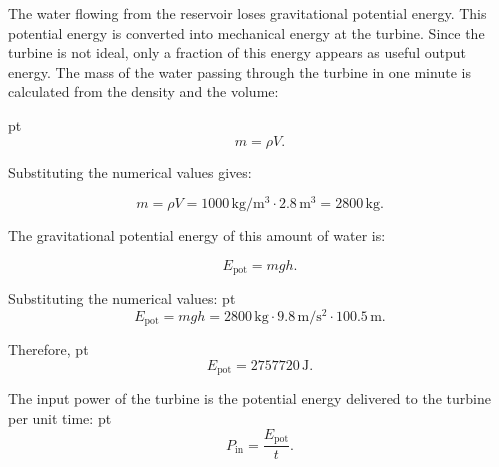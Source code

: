 \documentclass[t,aspectratio=169]{beamer}
\begin{document}
\begin{frame}
\begin{enumerate}
\begin{center}
\end{center}


The water flowing from the reservoir loses gravitational potential energy. This potential energy is converted into mechanical energy at the turbine. Since the turbine is not ideal, only a fraction of this energy appears as useful output energy. The mass of the water passing through the turbine in one minute is calculated from the density and the volume:

 pt
$$m = \rho V.$$

Substituting the numerical values gives:

$$m =  \rho V = 1000\,\mathrm{kg/m^3} \cdot 2.8\,\mathrm{m^3} = 2800\,\mathrm{kg}.$$

The gravitational potential energy of this amount of water is:

$$E_{\mathrm{pot}} = mgh.$$

\pagebreak
Substituting the numerical values:
 pt
$$E_{\mathrm{pot}} =  mgh = 2800\,\mathrm{kg} \cdot 9.8\,\mathrm{m/s^2} \cdot 100.5\,\mathrm{m}.$$

Therefore,
 pt
$$E_{\mathrm{pot}} = 2757720\,\mathrm{J}.$$

The input power of the turbine is the potential energy delivered to the turbine per unit time:
 pt
$$P_{\mathrm{in}} = \frac{E_{\mathrm{pot}}}{t}.$$


\end{enumerate}
\end{frame}
\end{document}
